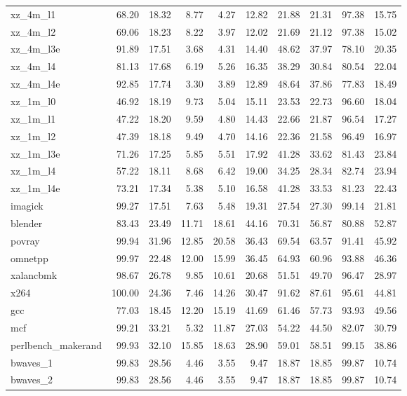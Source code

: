 \documentclass[10pt,a4paper]{article}
\begin{document}
{\begin{longtable}{@{}lrrrrrrrrr@{}}
xz\_4m\_l1 & 68.20 & 18.32 & 8.77 & 4.27 & 12.82 & 21.88 & 21.31 & 97.38 & 15.75 \\
xz\_4m\_l2 & 69.06 & 18.23 & 8.22 & 3.97 & 12.02 & 21.69 & 21.12 & 97.38 & 15.02 \\
xz\_4m\_l3e & 91.89 & 17.51 & 3.68 & 4.31 & 14.40 & 48.62 & 37.97 & 78.10 & 20.35 \\
xz\_4m\_l4 & 81.13 & 17.68 & 6.19 & 5.26 & 16.35 & 38.29 & 30.84 & 80.54 & 22.04 \\
xz\_4m\_l4e & 92.85 & 17.74 & 3.30 & 3.89 & 12.89 & 48.64 & 37.86 & 77.83 & 18.49 \\
xz\_1m\_l0 & 46.92 & 18.19 & 9.73 & 5.04 & 15.11 & 23.53 & 22.73 & 96.60 & 18.04 \\
xz\_1m\_l1 & 47.22 & 18.20 & 9.59 & 4.80 & 14.43 & 22.66 & 21.87 & 96.54 & 17.27 \\
xz\_1m\_l2 & 47.39 & 18.18 & 9.49 & 4.70 & 14.16 & 22.36 & 21.58 & 96.49 & 16.97 \\
xz\_1m\_l3e & 71.26 & 17.25 & 5.85 & 5.51 & 17.92 & 41.28 & 33.62 & 81.43 & 23.84 \\
xz\_1m\_l4 & 57.22 & 18.11 & 8.68 & 6.42 & 19.00 & 34.25 & 28.34 & 82.74 & 23.94 \\
xz\_1m\_l4e & 73.21 & 17.34 & 5.38 & 5.10 & 16.58 & 41.28 & 33.53 & 81.23 & 22.43 \\
imagick & 99.27 & 17.51 & 7.63 & 5.48 & 19.31 & 27.54 & 27.30 & 99.14 & 21.81 \\
blender & 83.43 & 23.49 & 11.71 & 18.61 & 44.16 & 70.31 & 56.87 & 80.88 & 52.87 \\
povray & 99.94 & 31.96 & 12.85 & 20.58 & 36.43 & 69.54 & 63.57 & 91.41 & 45.92 \\
omnetpp & 99.97 & 22.48 & 12.00 & 15.99 & 36.45 & 64.93 & 60.96 & 93.88 & 46.36 \\
xalancbmk & 98.67 & 26.78 & 9.85 & 10.61 & 20.68 & 51.51 & 49.70 & 96.47 & 28.97 \\
x264 & 100.00 & 24.36 & 7.46 & 14.26 & 30.47 & 91.62 & 87.61 & 95.61 & 44.81 \\
gcc & 77.03 & 18.45 & 12.20 & 15.19 & 41.69 & 61.46 & 57.73 & 93.93 & 49.56 \\
mcf & 99.21 & 33.21 & 5.32 & 11.87 & 27.03 & 54.22 & 44.50 & 82.07 & 30.79 \\
perlbench\_makerand & 99.93 & 32.10 & 15.85 & 18.63 & 28.90 & 59.01 & 58.51 & 99.15 & 38.86 \\
bwaves\_1 & 99.83 & 28.56 & 4.46 & 3.55 & 9.47 & 18.87 & 18.85 & 99.87 & 10.74 \\
bwaves\_2 & 99.83 & 28.56 & 4.46 & 3.55 & 9.47 & 18.87 & 18.85 & 99.87 & 10.74 \\

\end{longtable}}
\end{document}
